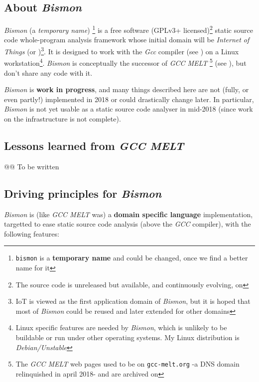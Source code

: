\subsection{About \textit{Bismon}}

\textit{Bismon} (a \emph{temporary name}) \footnote{\texttt{bismon} is
  a \textbf{temporary name} and could be changed, once we find a
  better name for it} is a free software (GPLv3+
licensed)\footnote{The source code is unreleased but available, and
  continuously evolving, on
  } static source code
whole-program analysis framework whose initial domain will be
\emph{Internet of Things} (or )\footnote{IoT is viewed
  as the first application domain of \textit{Bismon}, but it is hoped
  that most of \textit{Bismon} could be reused and later extended for
  other domains}. It is designed to work with the \textit{Gcc}
compiler (see ) on a Linux
workstation\footnote{Linux specific features are needed by
  \textit{Bismon}, which is unlikely to be buildable or run under
  other operating systems. My Linux distribution is
  \emph{Debian/Unstable}}. \textit{Bismon} is conceptually the
successor of \textit{GCC MELT} \footnote{The \textit{GCC MELT} web
  pages used to be on \texttt{gcc-melt.org} -a DNS domain relinquished
  in april 2018- and are archived on
  } (see
\cite{Starynkevitch2007Multistage, starynkevitch-DSL2011}), but don't
share any code with it.

{\large \textit{Bismon} is \textbf{work in progress}}, and many things
described here are not (fully, or even partly!) implemented in 2018 or
could drastically change later. In particular, \textit{Bismon} is not
yet usable as a static source code analyser in mid-2018 (since work on
the infrastructure is not complete).

\bigskip

\subsection{Lessons learned from \textit{GCC MELT}}

@@ To be written

\medskip

\subsection{Driving principles for  \textit{Bismon}}

\textit{Bismon} is (like \textit{GCC MELT} was) a \textbf{domain
  specific language} implementation, targetted to ease static source
code analysis (above the \textit{GCC} compiler), with the following
features:

